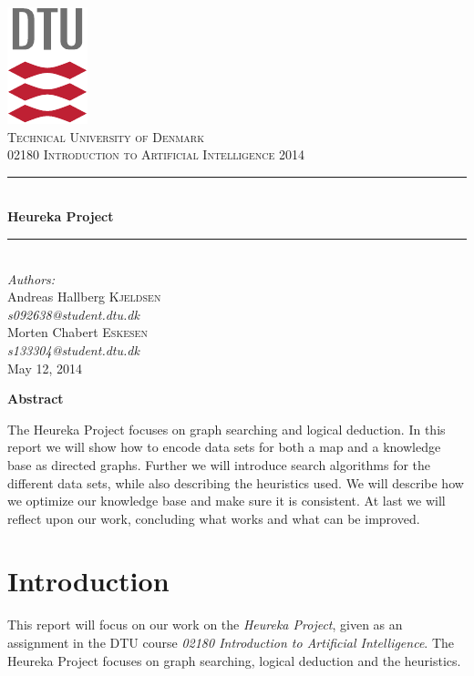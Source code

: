 \documentclass[11pt]{article}
\newcommand{\HRule}{\rule{\linewidth}{0.5mm}}
\begin{document}
\begin{titlepage}
\begin{center}

\includegraphics[scale=2.0]{GFX/dtu_logo.pdf}\\[1cm]

\textsc{\LARGE Technical University of Denmark}\\[1cm]

\textsc{\Large 02180 Introduction to Artificial Intelligence 2014}\\[0.5cm]


\HRule \\[0.4cm]
{\huge \bfseries Heureka Project}\\[0.1cm]
\HRule \\[0.4cm]

\large
\emph{Authors:}
\\[10pt]
Andreas Hallberg \textsc{Kjeldsen}\\
\emph{s092638@student.dtu.dk}
\\[10pt]
Morten Chabert \textsc{Eskesen}\\
\emph{s133304@student.dtu.dk}\\[0.8cm]

{\large May 12, 2014}\\[1.25cm]
\end{center}

\begin{center}
	\textbf{Abstract}
\end{center}
The Heureka Project focuses on graph searching and logical deduction. In this report we will show how to encode data sets for both a map and a knowledge base as directed graphs. Further we will introduce search algorithms for the different data sets, while also describing the heuristics used. We will describe how we optimize our knowledge base and make sure it is consistent. At last we will reflect upon our work, concluding what works and what can be improved.


\end{titlepage}

\section{Introduction}
\label{sec:intro}
This report will focus on our work on the \emph{Heureka Project}, given as an assignment in the DTU course \emph{02180 Introduction to Artificial Intelligence}. The Heureka Project focuses on graph searching, logical deduction and the heuristics.
\end{document}
